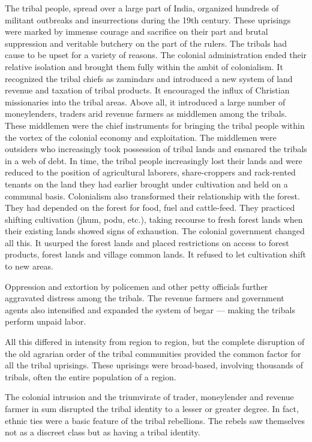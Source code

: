 \begin{multicols}{2}
The tribal people, spread over a large part of India, organized hundreds of militant outbreaks and insurrections during the 19th century. These uprisings were marked by immense courage and sacrifice on their part and brutal suppression and veritable butchery on the part of the rulers. The tribals had cause to be upset for a variety of reasons. The colonial administration ended their relative isolation and brought them fully within the ambit of colonialism. It recognized the tribal chiefs as zamindars and introduced a new system of land revenue and taxation of tribal products. It encouraged the influx of Christian missionaries into the tribal areas. Above all, it introduced a large number of moneylenders, traders arid revenue farmers as middlemen among the tribals. These middlemen were the chief instruments for bringing the tribal people within the vortex of the colonial economy and exploitation. The middlemen were outsiders who increasingly took possession of tribal lands and ensnared the tribals in a web of debt. In time, the tribal people increasingly lost their lands and were reduced to the position of agricultural laborers, share-croppers and rack-rented tenants on the land they had earlier brought under cultivation and held on a communal basis. Colonialism also transformed their relationship with the forest. They had depended on the forest for food, fuel and cattle-feed. They practiced shifting cultivation (jhum, podu, etc.), taking recourse to fresh forest lands when their existing lands showed signs of exhaustion. The colonial government changed all this. It usurped the forest lands and placed restrictions on access to forest products, forest lands and village common lands. It refused to let cultivation shift to new areas.

Oppression and extortion by policemen and other petty officials further aggravated distress among the tribals. The revenue farmers and government agents also intensified and expanded the system of begar --- making the tribals perform unpaid labor.

All this differed in intensity from region to region, but the complete disruption of the old agrarian order of the tribal communities provided the common factor for all the tribal uprisings. These uprisings were broad-based, involving thousands of tribals, often the entire population of a region.

The colonial intrusion and the triumvirate of trader, moneylender and revenue farmer in sum disrupted the tribal identity to a lesser or greater degree. In fact, ethnic ties were a basic feature of the tribal rebellions. The rebels saw themselves not as a discreet class but as having a tribal identity.


\end{multicols}
